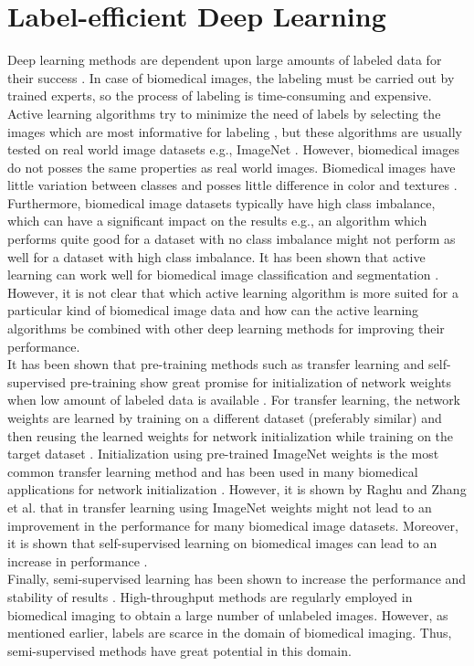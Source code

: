 \section{Label-efficient Deep Learning}
Deep learning methods are dependent upon large amounts of labeled data for their success \cite{sun2017}. In case of biomedical images, the labeling must be carried out by trained experts, so the process of labeling is time-consuming and expensive. Active learning algorithms try to minimize the need of labels by selecting the images which are most informative for labeling \cite{settles2009, sadafi2019, joshi2009}, but these algorithms are usually tested on real world image datasets e.g., ImageNet \cite{gal2016, ducoffe2015, holub2008}. However, biomedical images do not posses the same properties as real world images. Biomedical images have little variation between classes and posses little difference in color and textures \cite{matek2019, esteva2017}. Furthermore, biomedical image datasets typically have high class imbalance, which can have a significant impact on the results e.g., an algorithm which performs quite good for a dataset with no class imbalance might not perform as well for a dataset with high class imbalance. It has been shown that active learning can work well for biomedical image classification \cite{sadafi2019, smailagic2018} and segmentation \cite{yang2017}. However, it is not clear that which active learning algorithm is more suited for a particular kind of biomedical image data and how can the active learning algorithms be combined with other deep learning methods for improving their performance. \\
It has been shown that pre-training methods such as transfer learning and self-supervised pre-training show great promise for initialization of network weights when low amount of labeled data is available \cite{chen2020, oord2018, newell2020, sagheer2019}. For transfer learning, the network weights are learned by training on a different dataset (preferably similar) and then reusing the learned weights for network initialization while training on the target dataset \cite{jing2020}. Initialization using pre-trained ImageNet weights is the most common transfer learning method and has been used in many biomedical applications for network initialization \cite{rajpurkar2017, wang2017}. However, it is shown by Raghu and Zhang et al. \cite{raghu2019} that in transfer learning using ImageNet weights might not lead to an improvement in the performance for many biomedical image datasets. Moreover, it is shown that self-supervised learning on biomedical images can lead to an increase in performance \cite{holmberg2020}. \\
Finally, semi-supervised learning has been shown to increase the performance and stability of results \cite{sohn2020, tarvainen2017}. High-throughput methods are regularly employed in biomedical imaging \cite{blasi2016} to obtain a large number of unlabeled images. However, as mentioned earlier, labels are scarce in the domain of biomedical imaging. Thus, semi-supervised methods have great potential in this domain. \\

